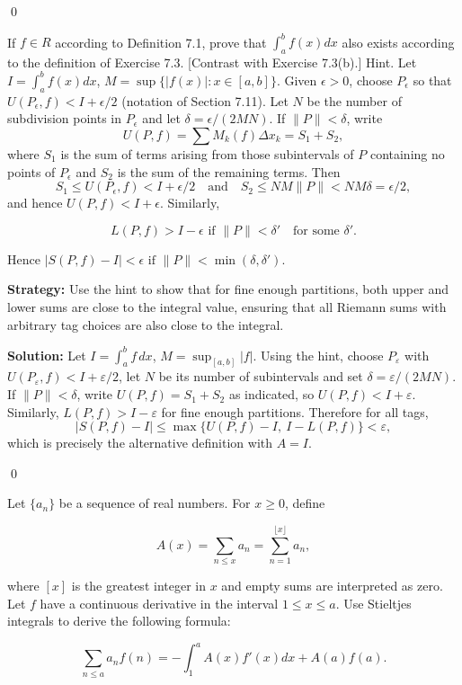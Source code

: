 \qed
\begin{problembox}
\begin{problemstatement}
If $f \in R$ according to Definition 7.1, prove that $\int_a^b f(x) dx$ also exists according to the definition of Exercise 7.3. [Contrast with Exercise 7.3(b).] Hint. Let $I = \int_a^b f(x) dx$, $M = \sup \{ |f(x)| : x \in [a, b] \}$. Given $\epsilon > 0$, choose $P_\epsilon$ so that $U(P_\epsilon, f) < I + \epsilon/2$ (notation of Section 7.11). Let $N$ be the number of subdivision points in $P_\epsilon$ and let $\delta = \epsilon/(2MN)$. If $\|P\| < \delta$, write 
\[U(P, f) = \sum M_k(f) \Delta x_k = S_1 + S_2,\]
where $S_1$ is the sum of terms arising from those subintervals of $P$ containing no points of $P_\epsilon$ and $S_2$ is the sum of the remaining terms. Then
\[S_1 \leq U(P_\epsilon, f) < I + \epsilon/2 \quad \text{and} \quad S_2 \leq NM \|P\| < NM\delta = \epsilon/2,\]
and hence $U(P, f) < I + \epsilon$. Similarly,

\[ L(P, f) > I - \epsilon \text{ if } \|P\| < \delta' \quad \text{for some } \delta'. \]

Hence $|S(P, f) - I| < \epsilon \text{ if } \|P\| < \min (\delta, \delta')$.
\end{problemstatement}
\end{problembox}

\noindent\textbf{Strategy:} Use the hint to show that for fine enough partitions, both upper and lower sums are close to the integral value, ensuring that all Riemann sums with arbitrary tag choices are also close to the integral.

\bigskip\noindent\textbf{Solution:}
Let $I=\int_a^b f\,dx$, $M=\sup_{[a,b]}|f|$. Using the hint, choose $P_\varepsilon$ with $U(P_\varepsilon,f)<I+\varepsilon/2$, let $N$ be its number of subintervals and set $\delta=\varepsilon/(2MN)$. If $\|P\|<\delta$, write $U(P,f)=S_1+S_2$ as indicated, so $U(P,f)<I+\varepsilon$. Similarly, $L(P,f)>I-\varepsilon$ for fine enough partitions. Therefore for all tags,
\[|S(P,f)-I|\le \max\{U(P,f)-I,\ I-L(P,f)\}<\varepsilon,
\]
which is precisely the alternative definition with $A=I$.




\qed
\begin{problembox}
\begin{problemstatement}
Let $\{a_n\}$ be a sequence of real numbers. For $x \geq 0$, define

\[ A(x) = \sum_{n \leq x} a_n = \sum_{n=1}^{\lfloor x \rfloor} a_n, \]

where $[x]$ is the greatest integer in $x$ and empty sums are interpreted as zero. Let $f$ have a continuous derivative in the interval $1 \leq x \leq a$. Use Stieltjes integrals to derive the following formula:

\[ \sum_{n \leq a} a_n f(n) = -\int_1^a A(x) f'(x) dx + A(a) f(a). \]
\end{problemstatement}
\end{problembox}

